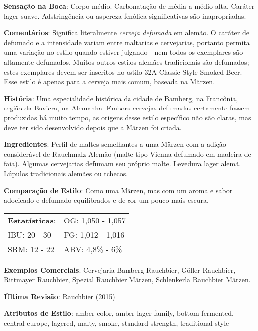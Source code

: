 \textbf{Sensação na Boca}: Corpo médio. Carbonatação de média a médio-alta. Caráter lager suave. Adstringência ou aspereza fenólica significativas são inapropriadas.

\textbf{Comentários}: Significa literalmente \textit{cerveja defumada} em alemão. O caráter de defumado e a intensidade variam entre maltarias e cervejarias, portanto permita uma variação no estilo quando estiver julgando - nem todos os exemplares são altamente defumados. Muitos outros estilos alemães tradicionais são defumados; estes exemplares devem ser inscritos no estilo 32A Classic Style Smoked Beer. Esse estilo é apenas para a cerveja mais comum, baseada na Märzen.

\textbf{História}: Uma especialidade histórica da cidade de Bamberg, na Francônia, região da Baviera, na Alemanha. Embora cervejas defumadas certamente fossem produzidas há muito tempo, as origens desse estilo específico não são claras, mas deve ter sido desenvolvido depois que a Märzen foi criada.

\textbf{Ingredientes}: Perfil de maltes semelhantes a uma Märzen com a adição considerável de Rauchmalz Alemão (malte tipo Vienna defumado em madeira de faia). Algumas cervejarias defumam seu próprio malte. Levedura lager alemã. Lúpulos tradicionais alemães ou tchecos.

\textbf{Comparação de Estilo}: Como uma Märzen, mas com um aroma e sabor adocicado e defumado equilibrados e de cor um pouco mais escura.

\begin{tabular}{@{}p{35mm}p{35mm}@{}}
  \textbf{Estatísticas}: & OG: 1,050 - 1,057 \\
  IBU: 20 - 30  & FG: 1,012 - 1,016  \\
  SRM: 12 - 22  & ABV: 4,8\% - 6\%
\end{tabular}

\textbf{Exemplos Comerciais}: Cervejaria Bamberg Rauchbier, Göller Rauchbier, Rittmayer Rauchbier, Spezial Rauchbier Märzen, Schlenkerla Rauchbier Märzen.

\textbf{Última Revisão}: Rauchbier (2015)

\textbf{Atributos de Estilo}: amber-color, amber-lager-family, bottom-fermented, central-europe, lagered, malty, smoke, standard-strength, traditional-style

